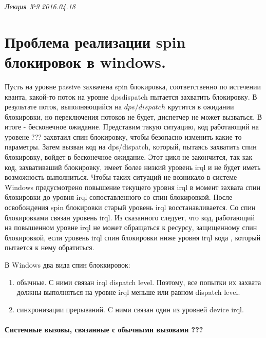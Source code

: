\clearpage
\begin{flushright}
	\textit{Лекция №9}
	\textit{2016.04.18}
\end{flushright}

\section{Проблема реализации spin блокировок в windows.}

Пусть на уровне passive захвачена spin блокировка, соответственно по истечении кванта, какой-то поток на уровне dpsdispatch пытается захватить блокировку. В результате поток, выполняющийся на  $dps/dispatch$ крутится  в ожидании блокировки, но переключения потоков не будет, диспетчер не может вызваться. В итоге - бесконечное ожидание.
Представим такую ситуацию, код работающий на уровене ??? захвтаил спин блокировку, чтобы безопасно изменить какие то параметры. Затем вызван код на dps/dispatch, который, пытаясь захватить спин блокировку, войдет в бесконечное ожидание. Этот цикл не закончится, так как код, захвативаший блокировку, имеет более низкий уровень irql и не будет иметь возможность выполниться.
Чтобы таких ситуаций не возникало в системе Windows предусмотрено повышение текущего уровня irql в момент захвата спин блокировки до уровня irql сопоставленного  со спин блокировкой. После освобождения spin блокировки старый уровень irql восстанавливается. Со спин блокировками связан уровень irql. Из сказанного следует, что код, работающий на повышенном уровне irql не может обращаться к ресурсу, защищенному спин блокировкой, если уровень irql спин блокировки ниже уровня irql кода , который пытается к нему обратиться.

В Windows два вида спин блоккировок:
\begin{enumerate}
	\item обычные. С ними связан irql dispatch level. Поэтому, все попытки их захвата должны выполняться на уровне irql меньше или равном dispatch level.
	\item синхронизации прерываний. C ними связан один из уровней device irql.
\end{enumerate}	

\paragraph{Системные вызовы, связанные с обычными вызовами ???}

